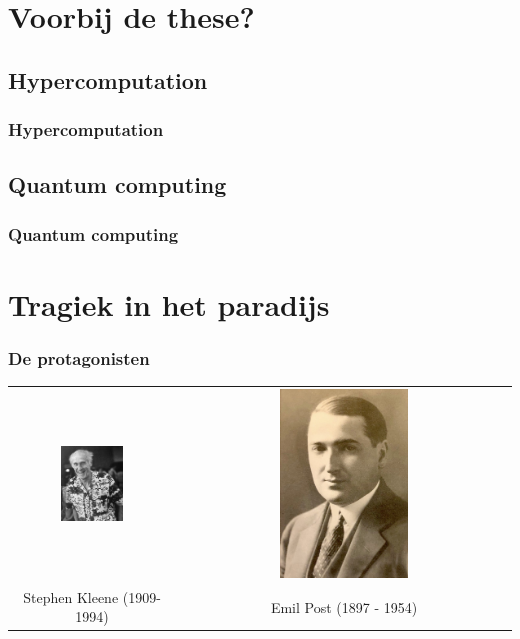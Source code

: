 \documentclass{beamer}
\begin{document}
\section{Voorbij de these?}
\subsection{Hypercomputation}
\begin{frame}
    \frametitle{Hypercomputation}
\end{frame}
\subsection{Quantum computing}
\begin{frame}
    \frametitle{Quantum computing}
\end{frame}

\section*{Tragiek in het paradijs}
\begin{frame}
    \frametitle{De protagonisten}
    \begin{tabular*}{\textwidth}{c c}
        \includegraphics[width=0.4\textwidth]{Kleene.jpeg} & \includegraphics[width=0.4\textwidth]{Post.jpg} \\
        {\large Stephen Kleene} (1909-1994) & {\large Emil Post} (1897 - 1954)\\
    \end{tabular*}
\end{frame}
\end{document}
